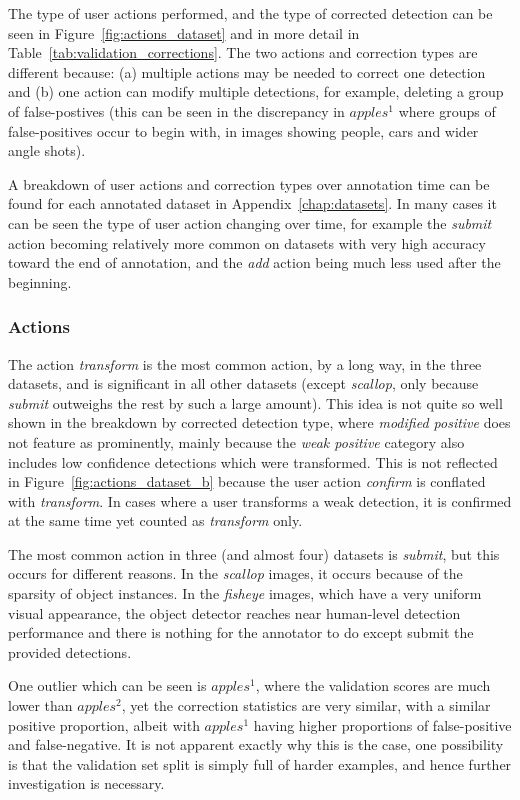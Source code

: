 The type of user actions performed, and the type of corrected detection can be seen in Figure~\ref{fig:actions_dataset} and in more detail in Table~\ref{tab:validation_corrections}. The two actions and correction types are different because: (a) multiple actions may be needed to correct one detection and (b) one action can modify multiple detections, for example, deleting a group of false-postives (this can be seen in the discrepancy in $apples^1$ where groups of false-positives occur to begin with, in images showing people, cars and wider angle shots).

A breakdown of user actions and correction types over annotation time can be found for each annotated dataset in Appendix~\ref{chap:datasets}. In many cases it can be seen the type of user action changing over time, for example the \emph{submit} action becoming relatively more common on datasets with very high accuracy toward the end of annotation, and the \emph{add} action being much less used after the beginning.

\subsubsection{Actions}

The action \emph{transform} is the most common action, by a long way, in the three datasets, and is significant in all other datasets (except \emph{scallop}, only because \emph{submit} outweighs the rest by such a large amount). This idea is not quite so well shown in the breakdown by corrected detection type, where \emph{modified positive} does not feature as prominently, mainly because the \emph{weak positive} category also includes low confidence detections which were transformed. This is not reflected in Figure~\ref{fig:actions_dataset_b} because the user action \emph{confirm} is conflated with \emph{transform}. In cases where a user transforms a weak detection, it is confirmed at the same time yet counted as \emph{transform} only.

The most common action in three (and almost four) datasets is \emph{submit}, but this occurs for different reasons. In the \emph{scallop} images, it occurs because of the sparsity of object instances. In the \emph{fisheye} images, which have a very uniform visual appearance, the object detector reaches near human-level detection performance and there is nothing for the annotator to do except submit the provided detections.

One outlier which can be seen is $apples^1$, where the validation scores are much lower than $apples^2$, yet the correction statistics are very similar, with a similar positive proportion, albeit with $apples^1$ having higher proportions of false-positive and false-negative. It is not apparent exactly why this is the case, one possibility is that the validation set split is simply full of harder examples, and hence further investigation is necessary.

